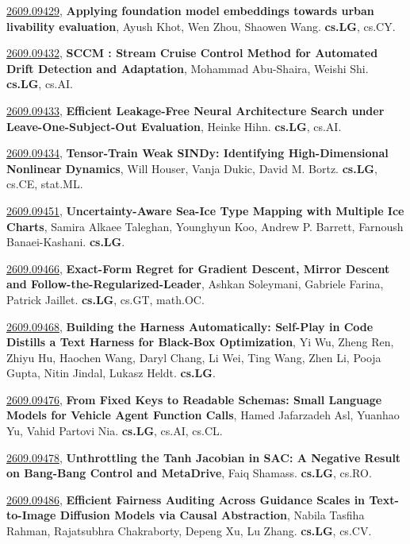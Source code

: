 \documentclass[9pt, a4paper]{article}
\theoremstyle{plain}
\theoremstyle{definition}
\theoremstyle{remark}
\newcommand{\arxivwithtarget}[3]{\hypertarget{#1}{}\href{https://arxiv.org/abs/#1}{#1}, \textbf{\textcolor{arxivblue}{#2}}, #3. }
\begin{document}
\arxivwithtarget{2609.09429}{Applying foundation model embeddings towards urban livability evaluation}{Ayush Khot, Wen Zhou, Shaowen Wang}\textbf{cs.LG}, cs.CY.



\arxivwithtarget{2609.09432}{SCCM : Stream Cruise Control Method for Automated Drift Detection and Adaptation}{Mohammad Abu-Shaira, Weishi Shi}\textbf{cs.LG}, cs.AI.



\arxivwithtarget{2609.09433}{Efficient Leakage-Free Neural Architecture Search under Leave-One-Subject-Out Evaluation}{Heinke Hihn}\textbf{cs.LG}, cs.AI.



\arxivwithtarget{2609.09434}{Tensor-Train Weak SINDy: Identifying High-Dimensional Nonlinear Dynamics}{Will Houser, Vanja Dukic, David M. Bortz}\textbf{cs.LG}, cs.CE, stat.ML.



\arxivwithtarget{2609.09451}{Uncertainty-Aware Sea-Ice Type Mapping with Multiple Ice Charts}{Samira Alkaee Taleghan, Younghyun Koo, Andrew P. Barrett, Farnoush Banaei-Kashani}\textbf{cs.LG}.



\arxivwithtarget{2609.09466}{Exact-Form Regret for Gradient Descent, Mirror Descent and Follow-the-Regularized-Leader}{Ashkan Soleymani, Gabriele Farina, Patrick Jaillet}\textbf{cs.LG}, cs.GT, math.OC.



\arxivwithtarget{2609.09468}{Building the Harness Automatically: Self-Play in Code Distills a Text Harness for Black-Box Optimization}{Yi Wu, Zheng Ren, Zhiyu Hu, Haochen Wang, Daryl Chang, Li Wei, Ting Wang, Zhen Li, Pooja Gupta, Nitin Jindal, Lukasz Heldt}\textbf{cs.LG}.



\arxivwithtarget{2609.09476}{From Fixed Keys to Readable Schemas: Small Language Models for Vehicle Agent Function Calls}{Hamed Jafarzadeh Asl, Yuanhao Yu, Vahid Partovi Nia}\textbf{cs.LG}, cs.AI, cs.CL.



\arxivwithtarget{2609.09478}{Unthrottling the Tanh Jacobian in SAC: A Negative Result on Bang-Bang Control and MetaDrive}{Faiq Shamass}\textbf{cs.LG}, cs.RO.



\arxivwithtarget{2609.09486}{Efficient Fairness Auditing Across Guidance Scales in Text-to-Image Diffusion Models via Causal Abstraction}{Nabila Tasfiha Rahman, Rajatsubhra Chakraborty, Depeng Xu, Lu Zhang}\textbf{cs.LG}, cs.CV.
\end{document}

